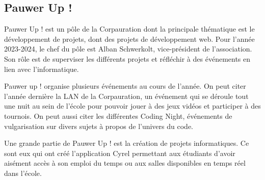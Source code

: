 \subsection{Pauwer Up !}

Pauwer Up ! est un pôle de la Corpauration dont la principale thématique est le développement de projets, dont des projets de développement web. Pour l'année 2023-2024, le chef du pôle est Alban Schwerkolt, vice-président de l'association. Son rôle est de superviser les différents projets et réfléchir à des événements en lien avec l'informatique.

Pauwer up ! organise plusieurs événements au cours de l'année. On peut citer l'année dernière la LAN de la Corpauration, un événement qui se déroule tout une nuit au sein de l'école pour pouvoir jouer à des jeux vidéos et participer à des tournois. On peut aussi citer les différentes Coding Night, événements de vulgarisation sur divers sujets à propos de l'univers du code.

Une grande partie de Pauwer Up ! est la création de projets informatiques. Ce sont eux qui ont créé l'application Cyrel permettant aux étudiants d'avoir aisément accès à son emploi du temps ou aux salles disponibles en temps réel dans l'école.